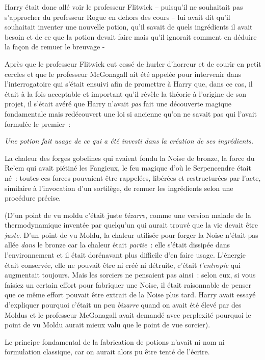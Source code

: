 Harry était donc allé voir le professeur Flitwick -- puisqu'il ne souhaitait pas s'approcher du professeur Rogue en dehors des cours -- lui avait dit qu'il souhaitait inventer une nouvelle potion, qu'il savait de quels ingrédients il avait besoin et de ce que la potion devait faire mais qu'il ignorait comment en déduire la façon de remuer le breuvage -

Après que le professeur Flitwick eut cessé de hurler d'horreur et de courir en petit cercles et que le professeur McGonagall ait été appelée pour intervenir dans l'interrogatoire qui s'était ensuivi afin de promettre à Harry que, dans ce cas, il était à la fois acceptable et important qu'il révèle la théorie à l'origine de son projet, il s'était avéré que Harry n'avait \emph{pas} fait une découverte magique fondamentale mais redécouvert une loi si ancienne qu'on ne savait pas qui l'avait formulée le premier~:

\emph{Une potion fait usage de ce qui a été investi dans la création de ses ingrédients.}

La chaleur des forges gobelines qui avaient fondu la Noise de bronze, la force du Re'em qui avait piétiné les Fangieux, le feu magique d'où le Serpencendre était né~: toutes ces forces pouvaient être rappelées, libérées et restructurées par l'acte, similaire à l'invocation d'un sortilège, de remuer les ingrédients selon une procédure précise.

(D'un point de vu moldu c'était juste \emph{bizarre}, comme une version malade de la thermodynamique inventée par quelqu'un qui aurait trouvé que la vie devait être \emph{juste}. D'un point de vu Moldu, la chaleur utilisée pour forger la Noise n'était pas allée \emph{dans} le bronze car la chaleur était \emph{partie}~: elle s'était dissipée dans l'environnement et il était dorénavant plus difficile d'en faire usage. L'énergie était conservée, elle ne pouvait être ni créé ni détruite, c'était \emph{l'entropie} qui augmentait toujours. Mais les sorciers ne pensaient pas ainsi~: selon eux, si vous faisiez un certain effort pour fabriquer une Noise, il était raisonnable de penser que ce même effort pouvait être extrait de la Noise plus tard. Harry avait essayé d'expliquer pourquoi c'était un peu \emph{bizarre} quand on avait été élevé par des Moldus et le professeur McGonagall avait demandé avec perplexité pourquoi le point de vu Moldu aurait mieux valu que le point de vue sorcier).

Le principe fondamental de la fabrication de potions n'avait ni nom ni formulation classique, car on aurait alors pu être tenté de l'écrire.

